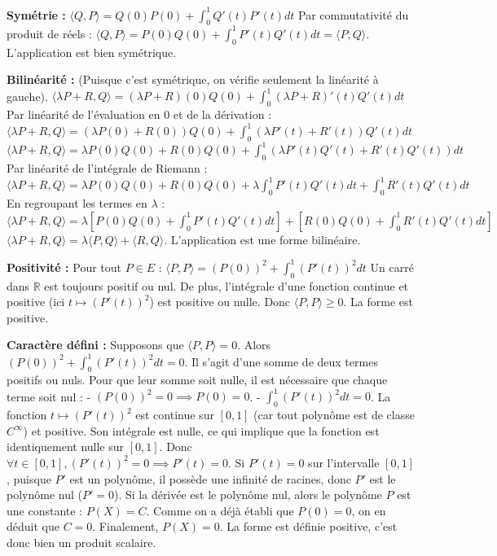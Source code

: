 \documentclass[11pt,a4paper]{report}
\begin{document}
\textbf{Symétrie :}
$\langle Q, P \rangle = Q(0)P(0) + \int_0^1 Q'(t)P'(t) dt$
Par commutativité du produit de réels :
$\langle Q, P \rangle = P(0)Q(0) + \int_0^1 P'(t)Q'(t) dt = \langle P, Q \rangle$.
L'application est bien symétrique.

\textbf{Bilinéarité :}
(Puisque c'est symétrique, on vérifie seulement la linéarité à gauche).
$\langle \lambda P + R, Q \rangle = (\lambda P + R)(0)Q(0) + \int_0^1 (\lambda P + R)'(t)Q'(t) dt$
Par linéarité de l'évaluation en 0 et de la dérivation :
$\langle \lambda P + R, Q \rangle = (\lambda P(0) + R(0))Q(0) + \int_0^1 (\lambda P'(t) + R'(t))Q'(t) dt$
$\langle \lambda P + R, Q \rangle = \lambda P(0)Q(0) + R(0)Q(0) + \int_0^1 (\lambda P'(t)Q'(t) + R'(t)Q'(t)) dt$
Par linéarité de l'intégrale de Riemann :
$\langle \lambda P + R, Q \rangle = \lambda P(0)Q(0) + R(0)Q(0) + \lambda \int_0^1 P'(t)Q'(t) dt + \int_0^1 R'(t)Q'(t) dt$
En regroupant les termes en $\lambda$ :
$\langle \lambda P + R, Q \rangle = \lambda \left[ P(0)Q(0) + \int_0^1 P'(t)Q'(t) dt \right] + \left[ R(0)Q(0) + \int_0^1 R'(t)Q'(t) dt \right]$
$\langle \lambda P + R, Q \rangle = \lambda \langle P, Q \rangle + \langle R, Q \rangle$.
L'application est une forme bilinéaire.

\textbf{Positivité :}
Pour tout $P \in E$ :
$\langle P, P \rangle = (P(0))^2 + \int_0^1 (P'(t))^2 dt$
Un carré dans $\mathbb{R}$ est toujours positif ou nul. De plus, l'intégrale d'une fonction continue et positive (ici $t \mapsto (P'(t))^2$) est positive ou nulle.
Donc $\langle P, P \rangle \ge 0$. La forme est positive.

\textbf{Caractère défini :}
Supposons que $\langle P, P \rangle = 0$.
Alors $(P(0))^2 + \int_0^1 (P'(t))^2 dt = 0$.
Il s'agit d'une somme de deux termes positifs ou nuls. Pour que leur somme soit nulle, il est nécessaire que chaque terme soit nul :
- $(P(0))^2 = 0 \implies P(0) = 0$.
- $\int_0^1 (P'(t))^2 dt = 0$.
La fonction $t \mapsto (P'(t))^2$ est continue sur $[0,1]$ (car tout polynôme est de classe $C^\infty$) et positive. Son intégrale est nulle, ce qui implique que la fonction est identiquement nulle sur $[0,1]$.
Donc $\forall t \in [0, 1], (P'(t))^2 = 0 \implies P'(t) = 0$.
Si $P'(t) = 0$ sur l'intervalle $[0, 1]$, puisque $P'$ est un polynôme, il possède une infinité de racines, donc $P'$ est le polynôme nul ($P' = 0$).
Si la dérivée est le polynôme nul, alors le polynôme $P$ est une constante : $P(X) = C$.
Comme on a déjà établi que $P(0) = 0$, on en déduit que $C = 0$.
Finalement, $P(X) = 0$.
La forme est définie positive, c'est donc bien un produit scalaire.
\end{document}

